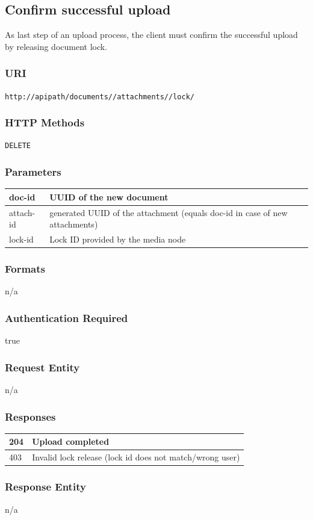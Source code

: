 \documentclass[10pt]{article}
\begin{document}
\subsection{Confirm successful upload}
As last step of an upload process, the client must confirm the successful upload by releasing document lock.
\subsubsection{URI}
\texttt{http://apipath/documents//attachments//lock/
}\subsubsection{HTTP Methods}
\texttt{DELETE}
\subsubsection{Parameters}
\begin{tabular}{|l|l|}\hline
doc-id & UUID of the new document \\
\hline
attach-id & generated UUID of the attachment (equals doc-id in case of new attachments) \\
\hline
lock-id & Lock ID provided by the media node \\
\hline
\end{tabular}
\subsubsection{Formats}
n/a
\subsubsection{Authentication Required}
true
\subsubsection{Request Entity}
n/a
\subsubsection{Responses}
\begin{tabular}{|l|l|}\hline
204 & Upload completed \\
\hline
403 & Invalid lock release (lock id does not match/wrong user) \\
\hline
\end{tabular}
\subsubsection{Response Entity}
n/a
\end{document}
